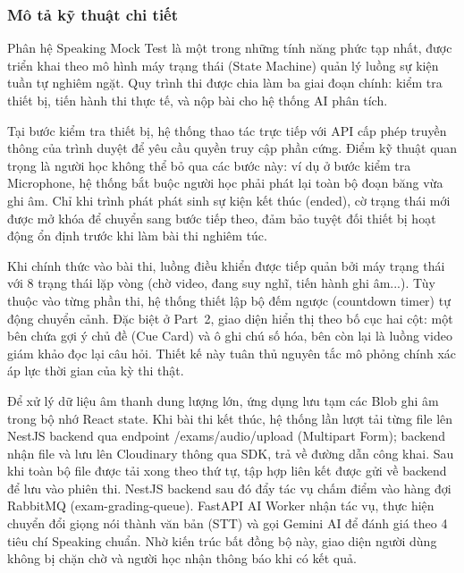 \subsubsection{Mô tả kỹ thuật chi tiết}

\begin{sloppypar}
Phân hệ Speaking Mock Test là một trong những tính năng phức tạp nhất, được triển khai theo mô hình máy trạng thái (State Machine) quản lý luồng sự kiện tuần tự nghiêm ngặt. Quy trình thi được chia làm ba giai đoạn chính: kiểm tra thiết bị, tiến hành thi thực tế, và nộp bài cho hệ thống AI phân tích.
\end{sloppypar}

Tại bước kiểm tra thiết bị, hệ thống thao tác trực tiếp với API cấp phép truyền thông của trình duyệt để yêu cầu quyền truy cập phần cứng. Điểm kỹ thuật quan trọng là người học không thể bỏ qua các bước này: ví dụ ở bước kiểm tra Microphone, hệ thống bắt buộc người học phải phát lại toàn bộ đoạn băng vừa ghi âm. Chỉ khi trình phát phát sinh sự kiện kết thúc (ended), cờ trạng thái mới được mở khóa để chuyển sang bước tiếp theo, đảm bảo tuyệt đối thiết bị hoạt động ổn định trước khi làm bài thi nghiêm túc.

\begin{sloppypar}
Khi chính thức vào bài thi, luồng điều khiển được tiếp quản bởi máy trạng thái với 8 trạng thái lặp vòng (chờ video, đang suy nghĩ, tiến hành ghi âm...). Tùy thuộc vào từng phần thi, hệ thống thiết lập bộ đếm ngược (countdown timer) tự động chuyển cảnh. Đặc biệt ở Part~2, giao diện hiển thị theo bố cục hai cột: một bên chứa gợi ý chủ đề (Cue Card) và ô ghi chú số hóa, bên còn lại là luồng video giám khảo đọc lại câu hỏi. Thiết kế này tuân thủ nguyên tắc mô phỏng chính xác áp lực thời gian của kỳ thi thật.
\end{sloppypar}

\begin{sloppypar}
Để xử lý dữ liệu âm thanh dung lượng lớn, ứng dụng lưu tạm các Blob ghi âm trong bộ nhớ React state. Khi bài thi kết thúc, hệ thống lần lượt tải từng file lên NestJS backend qua endpoint /exams/audio/upload (Multipart Form); backend nhận file và lưu lên Cloudinary thông qua SDK, trả về đường dẫn công khai. Sau khi toàn bộ file được tải xong theo thứ tự, tập hợp liên kết được gửi về backend để lưu vào phiên thi. NestJS backend sau đó đẩy tác vụ chấm điểm vào hàng đợi RabbitMQ (exam-grading-queue). FastAPI AI Worker nhận tác vụ, thực hiện chuyển đổi giọng nói thành văn bản (STT) và gọi Gemini AI để đánh giá theo 4 tiêu chí Speaking chuẩn. Nhờ kiến trúc bất đồng bộ này, giao diện người dùng không bị chặn chờ và người học nhận thông báo khi có kết quả.
\end{sloppypar}

